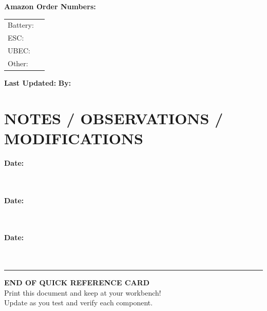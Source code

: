 \documentclass[10pt,letterpaper]{article}
\begin{document}
\textbf{Amazon Order Numbers:}
\begin{tabularx}{\textwidth}{lX}
Battery: & \underline{\hspace{8cm}} \\
ESC: & \underline{\hspace{8cm}} \\
UBEC: & \underline{\hspace{8cm}} \\
Other: & \underline{\hspace{8cm}} \\
\end{tabularx}

\vspace{1em}
\textbf{Last Updated:} \underline{\hspace{4cm}} \quad \textbf{By:} \underline{\hspace{4cm}}

\section*{NOTES / OBSERVATIONS / MODIFICATIONS}

\textbf{Date:} \underline{\hspace{4cm}}\\
\underline{\hspace{\textwidth}}\\
\underline{\hspace{\textwidth}}\\
\underline{\hspace{\textwidth}}

\textbf{Date:} \underline{\hspace{4cm}}\\
\underline{\hspace{\textwidth}}\\
\underline{\hspace{\textwidth}}\\
\underline{\hspace{\textwidth}}

\textbf{Date:} \underline{\hspace{4cm}}\\
\underline{\hspace{\textwidth}}\\
\underline{\hspace{\textwidth}}\\
\underline{\hspace{\textwidth}}

\begin{center}
\rule{\textwidth}{2pt}
\textbf{END OF QUICK REFERENCE CARD}\\
Print this document and keep at your workbench!\\
Update as you test and verify each component.
\end{center}
\end{document}
